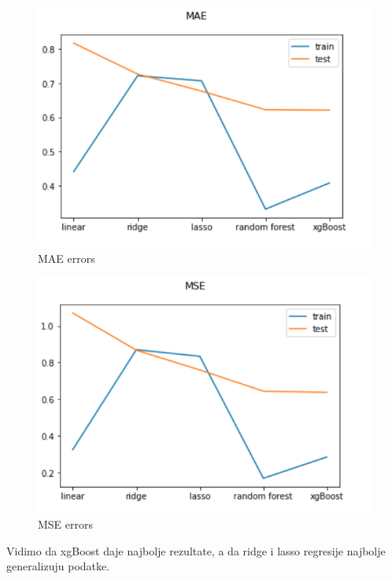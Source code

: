 \documentclass[a4paper]{article}
\begin{document}
\begin{figure}[h!]
\begin{center}
\includegraphics[scale=0.3]{mae_2.png}
\caption{MAE errors}
\label{fig:mae_2}
\end{center}
\end{figure}

\begin{figure}[h!]
\begin{center}
\includegraphics[scale=0.3]{mse_2.png}
\caption{MSE errors}
\label{fig:mse}
\end{center}
\end{figure}

Vidimo da xgBoost daje najbolje rezultate, a da ridge i lasso regresije najbolje generalizuju podatke.
\end{document}
